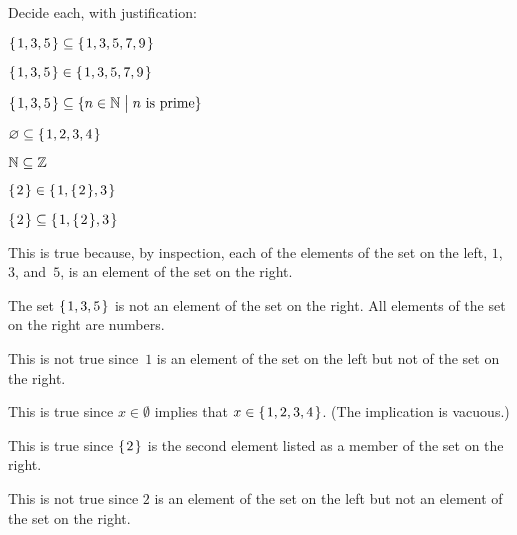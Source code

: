 \documentclass{test}  %
\begin{document}
\begin{ex} Decide each, with justification:
\begin{items}
\item $\mbox{$\{\hspace{0.1em}1,3,5\hspace{0.1em}\}$}\subseteq\mbox{$\{\hspace{0.1em}1,3, 5, 7, 9\hspace{0.1em}\}$}$
\item $\mbox{$\{\hspace{0.1em}1, 3, 5\hspace{0.1em}\}$}\in\mbox{$\{\hspace{0.1em}1, 3, 5, 7, 9\hspace{0.1em}\}$}$   
\item $\mbox{$\{\hspace{0.1em}1,3,5\hspace{0.1em}\}$}\subseteq\{n\in\mathbb{N} \bigm| \text{$n$ is prime}\}$
\item $\varnothing\subseteq\mbox{$\{\hspace{0.1em}1, 2, 3, 4\hspace{0.1em}\}$}$
\item $\mathbb{N}\subseteq\mathbb{Z}$
\item $\mbox{$\{\hspace{0.1em}2\hspace{0.1em}\}$}\in\mbox{$\{\hspace{0.1em}1, \mbox{$\{\hspace{0.1em}2\hspace{0.1em}\}$}, 3\hspace{0.1em}\}$}$
\item $\mbox{$\{\hspace{0.1em}2\hspace{0.1em}\}$}\subseteq\mbox{$\{\hspace{0.1em}1, \mbox{$\{\hspace{0.1em}2\hspace{0.1em}\}$}, 3\hspace{0.1em}\}$}$
\end{items}
\begin{ans}
\begin{items}
\item This is true because, by inspection, each of the elements of the set
  on the left, $1$, $3$, and~$5$, is an element of the set on the right.
\item The set $\mbox{$\{\hspace{0.1em}1,3,5\hspace{0.1em}\}$}$ is not an element of the set on the right.
  All elements of the set on the right are numbers.
\item This is not true since~$1$ is an element of the set on the left
  but not of the set on the right.
\item This is true since $x\in\emptyset$ implies that $x\in\mbox{$\{\hspace{0.1em}1, 2, 3, 4\hspace{0.1em}\}$}$. 
  (The implication is vacuous.)
\item This is true since $\mbox{$\{\hspace{0.1em}2\hspace{0.1em}\}$}$ is the second element listed as a
  member of the set on the right.
\item This is not true since $2$ is an element of the set on the left but
  not an element of the set on the right.
\end{items}
\end{ans}
\end{ex}
\end{document}
